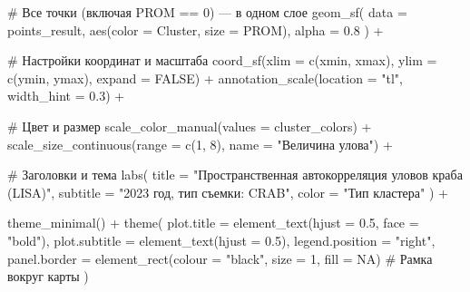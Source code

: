 \documentclass[
  letterpaper,
  DIV=11,
  numbers=noendperiod]{scrreprt}
\newenvironment{Shaded}{\begin{snugshade}}{\end{snugshade}}
\newcommand{\AttributeTok}[1]{\textcolor[rgb]{0.40,0.45,0.13}{#1}}
\newcommand{\CommentTok}[1]{\textcolor[rgb]{0.37,0.37,0.37}{#1}}
\newcommand{\ConstantTok}[1]{\textcolor[rgb]{0.56,0.35,0.01}{#1}}
\newcommand{\DecValTok}[1]{\textcolor[rgb]{0.68,0.00,0.00}{#1}}
\newcommand{\FloatTok}[1]{\textcolor[rgb]{0.68,0.00,0.00}{#1}}
\newcommand{\FunctionTok}[1]{\textcolor[rgb]{0.28,0.35,0.67}{#1}}
\newcommand{\NormalTok}[1]{\textcolor[rgb]{0.00,0.23,0.31}{#1}}
\newcommand{\SpecialCharTok}[1]{\textcolor[rgb]{0.37,0.37,0.37}{#1}}
\newcommand{\StringTok}[1]{\textcolor[rgb]{0.13,0.47,0.30}{#1}}
\begin{document}
\begin{Shaded}
\begin{Highlighting}[]
  \CommentTok{\# Все точки (включая PROM == 0) — в одном слое}
  \FunctionTok{geom\_sf}\NormalTok{(}
    \AttributeTok{data =}\NormalTok{ points\_result,}
    \FunctionTok{aes}\NormalTok{(}\AttributeTok{color =}\NormalTok{ Cluster, }\AttributeTok{size =}\NormalTok{ PROM),}
    \AttributeTok{alpha =} \FloatTok{0.8}
\NormalTok{  ) }\SpecialCharTok{+}
  
  \CommentTok{\# Настройки координат и масштаба}
  \FunctionTok{coord\_sf}\NormalTok{(}\AttributeTok{xlim =} \FunctionTok{c}\NormalTok{(xmin, xmax), }\AttributeTok{ylim =} \FunctionTok{c}\NormalTok{(ymin, ymax), }\AttributeTok{expand =} \ConstantTok{FALSE}\NormalTok{) }\SpecialCharTok{+}
  \FunctionTok{annotation\_scale}\NormalTok{(}\AttributeTok{location =} \StringTok{"tl"}\NormalTok{, }\AttributeTok{width\_hint =} \FloatTok{0.3}\NormalTok{) }\SpecialCharTok{+}
  
  \CommentTok{\# Цвет и размер}
  \FunctionTok{scale\_color\_manual}\NormalTok{(}\AttributeTok{values =}\NormalTok{ cluster\_colors) }\SpecialCharTok{+}
  \FunctionTok{scale\_size\_continuous}\NormalTok{(}\AttributeTok{range =} \FunctionTok{c}\NormalTok{(}\DecValTok{1}\NormalTok{, }\DecValTok{8}\NormalTok{), }\AttributeTok{name =} \StringTok{"Величина улова"}\NormalTok{) }\SpecialCharTok{+}
  
  \CommentTok{\# Заголовки и тема}
  \FunctionTok{labs}\NormalTok{(}
    \AttributeTok{title =} \StringTok{"Пространственная автокорреляция уловов краба (LISA)"}\NormalTok{,}
    \AttributeTok{subtitle =} \StringTok{"2023 год, тип съемки: CRAB"}\NormalTok{,}
    \AttributeTok{color =} \StringTok{"Тип кластера"}
\NormalTok{  ) }\SpecialCharTok{+}
  
\FunctionTok{theme\_minimal}\NormalTok{() }\SpecialCharTok{+}
  \FunctionTok{theme}\NormalTok{(}
    \AttributeTok{plot.title =} \FunctionTok{element\_text}\NormalTok{(}\AttributeTok{hjust =} \FloatTok{0.5}\NormalTok{, }\AttributeTok{face =} \StringTok{"bold"}\NormalTok{),}
    \AttributeTok{plot.subtitle =} \FunctionTok{element\_text}\NormalTok{(}\AttributeTok{hjust =} \FloatTok{0.5}\NormalTok{),}
    \AttributeTok{legend.position =} \StringTok{"right"}\NormalTok{,}
    \AttributeTok{panel.border =} \FunctionTok{element\_rect}\NormalTok{(}\AttributeTok{colour =} \StringTok{"black"}\NormalTok{, }\AttributeTok{size =} \DecValTok{1}\NormalTok{, }\AttributeTok{fill =} \ConstantTok{NA}\NormalTok{)  }\CommentTok{\# Рамка вокруг карты}
\NormalTok{  )}
\end{Highlighting}
\end{Shaded}
\end{document}
